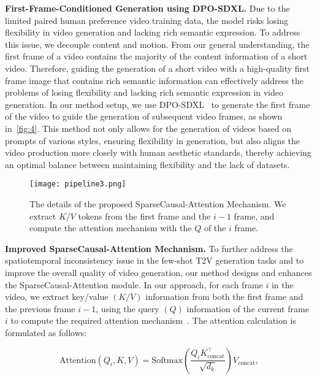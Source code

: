 \noindent\textbf{First-Frame-Conditioned Generation using DPO-SDXL.}
Due to the limited paired human preference video training data, the model risks losing flexibility in video generation and lacking rich semantic expression. To address this issue, we decouple content and motion. From our general understanding, the first frame of a video contains the majority of the content information of a short video. Therefore, guiding the generation of a short video with a high-quality first frame image that contains rich semantic information can effectively address the problems of losing flexibility and lacking rich semantic expression in video generation. In our method setup, we use DPO-SDXL~\cite{wallace2024diffusion} to generate the first frame of the video to guide the generation of subsequent video frames, as shown in~\cref{fig:4}. This method not only allows for the generation of videos based on prompts of various styles, ensuring flexibility in generation, but also aligns the video production more closely with human aesthetic standards, thereby achieving an optimal balance between maintaining flexibility and the lack of datasets.


\begin{figure}[t]
  \centering
    \texttt{[image: pipeline3.png]}

   \caption{The details of the proposed SparseCausal-Attention Mechanism. We extract $K/V$ tokens from the first frame and the $i-1$ frame, and compute the attention mechanism with the $Q$ of the $i$ frame.}
   \label{fig:3}
\end{figure}


\vspace{0.1cm}
\noindent\textbf{Improved SparseCausal-Attention Mechanism.}
To further address the spatiotemporal inconsistency issue in the few-shot T2V generation tasks and to improve the overall quality of video generation, our method designs and enhances the SparseCausal-Attention module. In our approach, for each frame $i$ in the video, we extract key/value \((K/V)\) information from both the first frame and the previous frame $i-1$, using the query \((Q)\) information of the current frame $i$ to compute the required attention mechanism~\cite{xing2024simda,wang2023crossformer++}. The attention calculation is formulated as follows:

\begin{equation}
\text{Attention}(Q_i, K, V) = \text{Softmax}\left(\frac{Q_i K_{\text{concat}}^\top}{\sqrt{d_k}}\right) V_{\text{concat}},
\label{eq:attention_calculation}
\end{equation}

